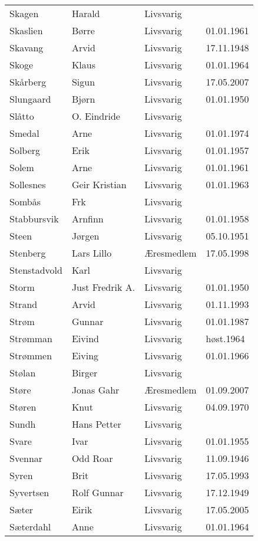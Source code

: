 \begin{longtable}{llll}
Skagen	&	Harald	&	Livsvarig 	&		\\
Skaslien	&	Børre	&	Livsvarig 	&	01.01.1961	\\
Skavang	&	Arvid	&	Livsvarig 	&	17.11.1948	\\
Skoge	&	Klaus	&	Livsvarig 	&	01.01.1964	\\
Skårberg	&	Sigun	&	Livsvarig	&	17.05.2007	\\
Slungaard	&	Bjørn	&	Livsvarig 	&	01.01.1950	\\
Slåtto	&	O. Eindride	&	Livsvarig 	&		\\
Smedal	&	Arne	&	Livsvarig 	&	01.01.1974	\\
Solberg	&	Erik	&	Livsvarig 	&	01.01.1957	\\
Solem	&	Arne	&	Livsvarig 	&	01.01.1961	\\
Sollesnes	&	Geir Kristian	&	Livsvarig 	&	01.01.1963	\\
Sombås	&	Frk	&	Livsvarig 	&		\\
Stabbursvik	&	Arnfinn	&	Livsvarig 	&	01.01.1958	\\
Steen	&	Jørgen	&	Livsvarig 	&	05.10.1951	\\
Stenberg 	&	Lars Lillo 	&	Æresmedlem	&	17.05.1998	\\
Stenstadvold	&	Karl	&	Livsvarig 	&		\\
Storm	&	Just Fredrik A.	&	Livsvarig 	&	01.01.1950	\\
Strand	&	Arvid	&	Livsvarig 	&	01.11.1993	\\
Strøm	&	Gunnar	&	Livsvarig 	&	01.01.1987	\\
Strømman	&	Eivind	&	Livsvarig 	&	høst.1964	\\
Strømmen	&	Eiving	&	Livsvarig 	&	01.01.1966	\\
Stølan	&	Birger	&	Livsvarig 	&		\\
Støre	&	Jonas Gahr	&	Æresmedlem	&	01.09.2007	\\
Støren	&	Knut	&	Livsvarig 	&	04.09.1970	\\
Sundh	&	Hans Petter	&	Livsvarig 	&		\\
Svare	&	Ivar	&	Livsvarig 	&	01.01.1955	\\
Svennar	&	Odd Roar	&	Livsvarig 	&	11.09.1946	\\
Syren	&	Brit	&	Livsvarig 	&	17.05.1993	\\
Syvertsen	&	Rolf Gunnar	&	Livsvarig 	&	17.12.1949	\\
Sæter 	&	Eirik	&	Livsvarig	&	17.05.2005	\\
Sæterdahl	&	Anne	&	Livsvarig 	&	01.01.1964	\\

\end{longtable}
